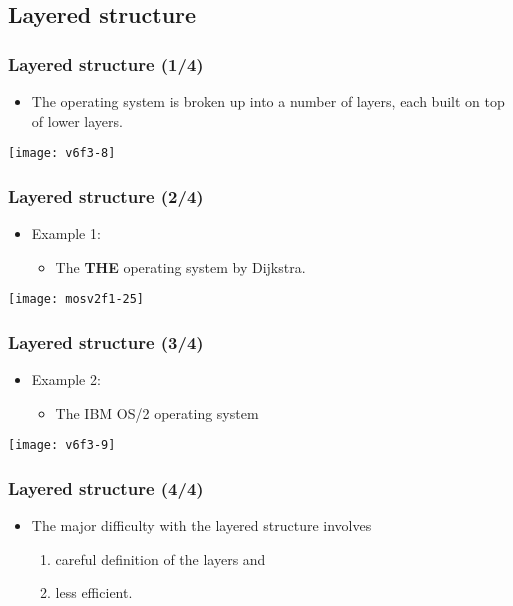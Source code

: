 \documentclass[CJKutf8,dvipsnames,table]{beamer}
\begin{document}
\begin{CJK*}{UTF8}{song}
  \subsection{Layered structure}

  \begin{frame}
    \frametitle{Layered structure (1/4)} \pause
    \begin{itemize}
    \item The operating system is broken up into a number of layers, each built on top of lower layers.  \pause
    \end{itemize}
    \begin{center}
      \texttt{[image: v6f3-8]}
    \end{center}
  \end{frame}

  \begin{frame}
    \frametitle{Layered structure (2/4)} \pause
    \begin{itemize}
    \item Example 1:  \pause
      \begin{itemize}
      \item The \textbf{THE} operating system by Dijkstra. 
      \end{itemize}
    \end{itemize}
    \begin{center}
      \texttt{[image: mosv2f1-25]}
    \end{center}
  \end{frame}

  \begin{frame}
    \frametitle{Layered structure (3/4)} \pause
    \begin{itemize}
    \item Example 2:  \pause
      \begin{itemize}
      \item The IBM OS/2 operating system  \pause
      \end{itemize}
    \end{itemize}
    \begin{center}
      \texttt{[image: v6f3-9]}
    \end{center}
  \end{frame}
  
  \begin{frame}
    \frametitle{Layered structure (4/4)} \pause
    \begin{itemize}
    \item The major difficulty with the layered structure involves  \pause
      \begin{enumerate}
      \item careful definition of the layers and  \pause
      \item less efficient. 
      \end{enumerate}
    \end{itemize}
  \end{frame}
  

\end{CJK*}
\end{document}
